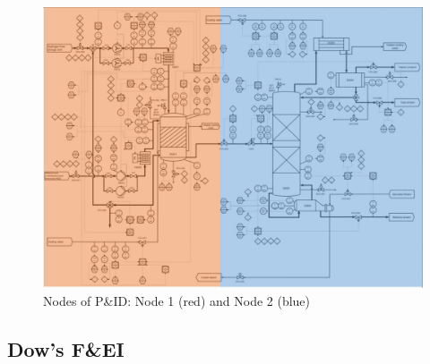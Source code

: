 \begin{figure}[h]%
\includegraphics[width=\linewidth]{chapters/5-safety-layout-environment/figures/Node.jpg}
\caption{Nodes of P\&ID: Node 1 (red) and Node 2 (blue)}
\label{fig:node}
\end{figure}


\subsection{Dow's F\&EI}
\label{app:F&EI}

